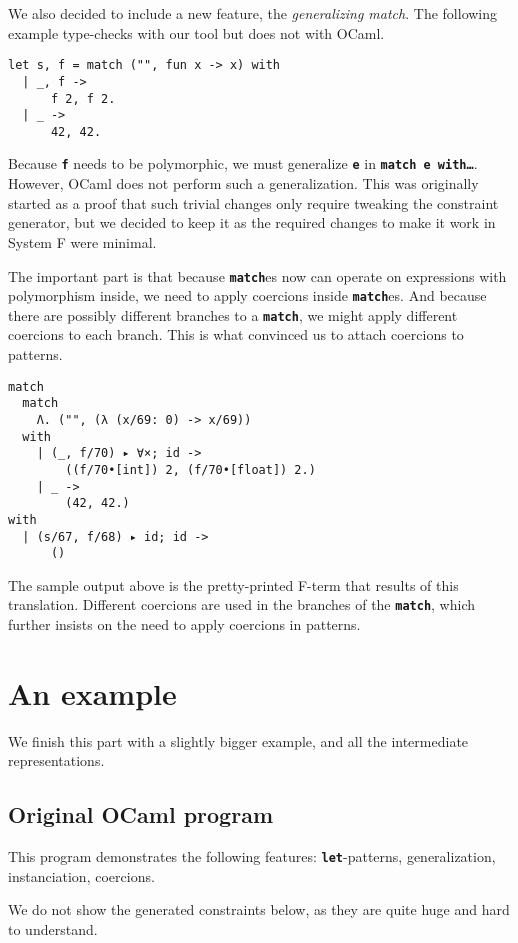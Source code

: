 \documentclass[10pt,a4paper,twoside,titlepage,twocolumn]{article}
\newcommand{\code}[1]{\textbf{\texttt{#1}}}
\begin{document}
We also decided to include a new feature, the \emph{generalizing match}. The
following example type-checks with our tool but does not with OCaml.

\begin{verbatim}
let s, f = match ("", fun x -> x) with
  | _, f ->
      f 2, f 2.
  | _ ->
      42, 42.
\end{verbatim}

Because \code{f} needs to be polymorphic, we must generalize \code{e} in
\code{match e with\dots}. However, OCaml does not perform such a generalization.
This was originally started as a proof that such trivial changes only require
tweaking the constraint generator, but we decided to keep it as the required
changes to make it work in System F were minimal.

The important part is that because \code{match}es now can operate on
expressions with polymorphism inside, we need to apply coercions inside
\code{match}es. And because there are possibly different branches to a
\code{match}, we might apply different coercions to each branch. This is what
convinced us to attach coercions to patterns.

\begin{verbatim}
match
  match
    Λ. ("", (λ (x/69: 0) -> x/69))
  with
    | (_, f/70) ▸ ∀×; id ->
        ((f/70•[int]) 2, (f/70•[float]) 2.)
    | _ ->
        (42, 42.)
with
  | (s/67, f/68) ▸ id; id ->
      ()
\end{verbatim}

The sample output above is the pretty-printed F-term that results of this
translation. Different coercions are used in the branches of the \code{match},
which further insists on the need to apply coercions in patterns.

\section{An example}

We finish this part with a slightly bigger example, and all the intermediate
representations.

\subsection{Original OCaml program}

This program demonstrates the following features: \code{let}-patterns,
generalization, instanciation, coercions.

We do not show the generated constraints below, as they are quite huge and hard
to understand.
\end{document}

